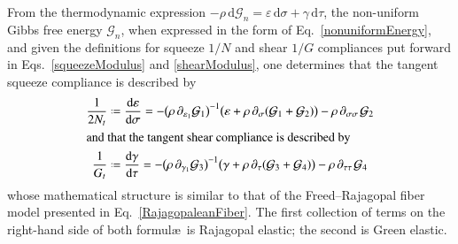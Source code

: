 From the thermo\-dynamic expression $-\rho \, \mathrm{d} \mathcal{G}_n = \varepsilon \, \mathrm{d} \sigma + \gamma \, \mathrm{d} \tau$, the non-uniform Gibbs free energy $\mathcal{G}_n$, when expressed in the form of Eq.~\ref{nonuniformEnergy}, and given the definitions for squeeze $1/N$ and shear $1/G$ compliances put forward in Eqs.~\ref{squeezeModulus} and \ref{shearModulus}, one determines that the tangent squeeze compliance is described by
\begin{subequations}
    \label{nonuniformCompliances}
    \begin{align}
    \frac{1}{2N_t} & \defeq \frac{\mathrm{d} \varepsilon}{\mathrm{d} \sigma} = - \bigl( \rho \, \partial_{\varepsilon_1} \mathcal{G}_1 \bigr)^{-1} \bigl( \varepsilon + \rho \, \partial_{\sigma} ( \mathcal{G}_1 + \mathcal{G}_2 ) \bigr) - \rho \, \partial_{\sigma\sigma\,} \mathcal{G}_2
    \label{squeezeCompliance} \\
    \intertext{and that the tangent shear compliance is described by}
    \frac{1}{G_t} & \defeq \frac{\mathrm{d} \gamma}{\mathrm{d} \tau} = - \bigl( \rho \, \partial_{\gamma_1} \mathcal{G}_3 \bigr)^{-1} \bigl( \gamma + \rho \, \partial_{\tau} ( \mathcal{G}_3 + \mathcal{G}_4 ) \bigr) - \rho \, \partial_{\tau\tau\,} \mathcal{G}_4
    \label{shearCompliance}
    \end{align}
\end{subequations}
whose mathematical structure is similar to that of the Freed--Rajagopal fiber model presented in Eq.~\ref{RajagopaleanFiber}.  The first collection of terms on the right-hand side of both formul\ae\ is Rajagopal elastic; the second is Green elastic.  

